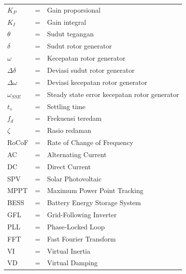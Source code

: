 \begin{tabular}{llp{3in}}
	$K_P$ & \hspace{1.5cm} = & Gain proporsional \\
	$K_I$ & \hspace{1.5cm} = & Gain integral \\
	$\theta$ & \hspace{1.5cm} = & Sudut tegangan \\
	$\delta$ & \hspace{1.5cm} = & Sudut rotor generator \\
	$\omega$ & \hspace{1.5cm} = & Kecepatan rotor generator \\
	$\Delta\delta$ & \hspace{1.5cm} = & Deviasi sudut rotor generator \\
	$\Delta\omega$	& \hspace{1.5cm} = & Deviasi kecepatan rotor generator \\
	$\omega_{SSE}$	& \hspace{1.5cm} = & Steady state error kecepatan rotor generator \\
	$t_{s}$ & \hspace{1.5cm} = & Settling time \\
	$f_{d}$ & \hspace{1.5cm} = & Frekuensi teredam \\
	$\zeta$ & \hspace{1.5cm} = & Rasio redaman \\
	RoCoF & \hspace{1.5cm} = & Rate of Change of Frequency \\
	AC & \hspace{1.5cm} = & Alternating Current \\
	DC & \hspace{1.5cm} = & Direct Current \\
	SPV & \hspace{1.5cm} = & Solar Photovoltaic \\
	MPPT & \hspace{1.5cm} = & Maximum Power Point Tracking \\
	BESS & \hspace{1.5cm} = & Battery Energy Storage System \\
	GFL & \hspace{1.5cm} = & Grid-Following Inverter \\
	PLL & \hspace{1.5cm} = & Phase-Locked Loop \\
	FFT & \hspace{1.5cm} = & Fast Fourier Transform \\
	VI & \hspace{1.5cm} = & Virtual Inertia \\
	VD & \hspace{1.5cm} = & Virtual Damping \\
\end{tabular}
